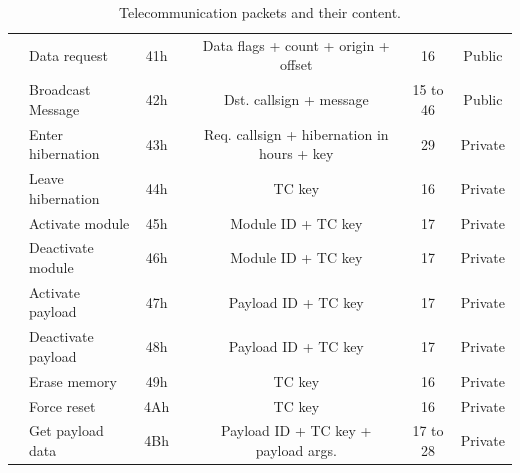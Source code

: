 \begin{landscape}
\begin{table}[ht]
\begin{tabular}{llccccc}
                                      & Data request          & 41h &                                     & Data flags + count + origin + offset       & 16                    & Public \\
                                      & Broadcast Message     & 42h &                                     & Dst. callsign + message                    & 15 to 46              & Public \\
                                      & Enter hibernation     & 43h &                                     & Req. callsign + hibernation in hours + key & 29                    & Private \\
                                      & Leave hibernation     & 44h &                                     & TC key                                     & 16                    & Private \\
                                      & Activate module       & 45h &                                     & Module ID + TC key                         & 17                    & Private \\
                                      & Deactivate module     & 46h &                                     & Module ID + TC key                         & 17                    & Private \\
                                      & Activate payload      & 47h &                                     & Payload ID + TC key                        & 17                    & Private \\
                                      & Deactivate payload    & 48h &                                     & Payload ID + TC key                        & 17                    & Private \\
                                      & Erase memory          & 49h &                                     & TC key                                     & 16                    & Private \\
                                      & Force reset           & 4Ah &                                     & TC key                                     & 16                    & Private \\
                                      & Get payload data      & 4Bh &                                     & Payload ID + TC key + payload args.        & 17 to 28              & Private \\
            \bottomrule[1.5pt]
        \end{tabular}
        \caption{Telecommunication packets and their content.}
        \label{tab:packets-struct}
    \end{table}
\end{landscape}

